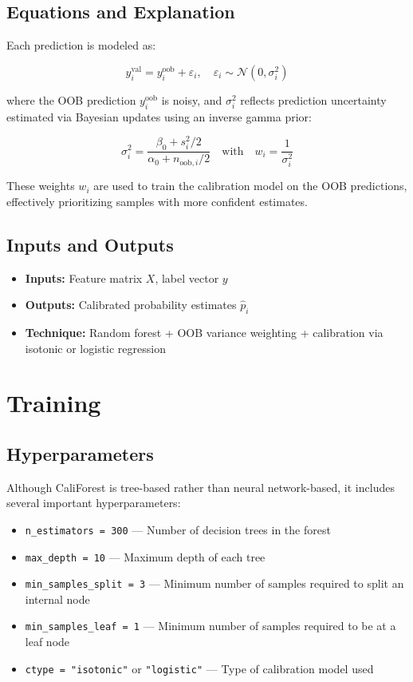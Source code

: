 \documentclass{article}
\begin{document}
\subsection*{Equations and Explanation}

Each prediction is modeled as:

\[
y_i^{\text{val}} = y_i^{\text{oob}} + \varepsilon_i,\quad \varepsilon_i \sim \mathcal{N}(0, \sigma_i^2)
\]

where the OOB prediction $y_i^{\text{oob}}$ is noisy, and $\sigma_i^2$ reflects prediction uncertainty estimated via Bayesian updates using an inverse gamma prior:

\[
\sigma_i^2 = \frac{\beta_0 + s_i^2/2}{\alpha_0 + n_{\text{oob}, i}/2}
\quad\text{with}\quad
w_i = \frac{1}{\sigma_i^2}
\]

These weights $w_i$ are used to train the calibration model on the OOB predictions, effectively prioritizing samples with more confident estimates.

\subsection*{Inputs and Outputs}

\begin{itemize}
  \item \textbf{Inputs:} Feature matrix $X$, label vector $y$
  \item \textbf{Outputs:} Calibrated probability estimates $\hat{p}_i$
  \item \textbf{Technique:} Random forest + OOB variance weighting + calibration via isotonic or logistic regression
\end{itemize}

\section{Training}

\subsection*{Hyperparameters}

Although CaliForest is tree-based rather than neural network-based, it includes several important hyperparameters:

\begin{itemize}
  \item \texttt{n\_estimators = 300} — Number of decision trees in the forest
  \item \texttt{max\_depth = 10} — Maximum depth of each tree
  \item \texttt{min\_samples\_split = 3} — Minimum number of samples required to split an internal node
  \item \texttt{min\_samples\_leaf = 1} — Minimum number of samples required to be at a leaf node
  \item \texttt{ctype = "isotonic"} or \texttt{"logistic"} — Type of calibration model used
\end{itemize}
\end{document}
